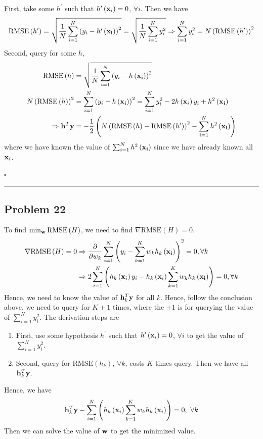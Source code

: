 \documentclass[12pt]{article}
\newcommand*{\QEDB}{\hfill\ensuremath{\square}}
\newcommand{\ParTh}[1]{\left(#1\right)}
\newcommand{\BF}[1]{{\bf#1}}
\newcommand{\horrule}[1]{\rule{\linewidth}{#1}}
\begin{document}
First, take some $h^\prime$ such that $h^\prime\ParTh{\BF{x}_i}=0$, $\forall i$. Then we have
\begin{align}
\text{RMSE}\ParTh{h^\prime}=\sqrt{\dfrac{1}{N}\sum_{i=1}^{N}\ParTh{y_i-h^\prime\ParTh{\BF{x_i}}}^2}=\sqrt{\dfrac{1}{N}\sum_{i=1}^{N}y^2_i}\Rightarrow\sum_{i=1}^{N}y^2_i=N\ParTh{\text{RMSE}\ParTh{h^\prime}}^2
\end{align}
Second, query for some $h$,
\begin{align}
\text{RMSE}\ParTh{h}&=\sqrt{\dfrac{1}{N}\sum_{i=1}^{N}\ParTh{y_i-h\ParTh{\BF{x_i}}}^2}\\
N\ParTh{\text{RMSE}\ParTh{h}}^2&=\sum_{i=1}^{N}\ParTh{y_i-h\ParTh{\BF{x_i}}}^2=\sum_{i=1}^{N}y^2_i-2h\ParTh{\BF{x}_i}y_i+h^2\ParTh{\BF{x_i}}\\
\Rightarrow\BF{h}^T\BF{y}&=-\dfrac{1}{2}\ParTh{N\ParTh{\text{RMSE}\ParTh{h}-\text{RMSE}\ParTh{h^\prime}}^2-\sum_{i=1}^{N}h^2\ParTh{\BF{x_i}}}
\end{align}
where we have known the value of $\sum_{i=1}^{N}h^2\ParTh{\BF{x_i}}$ since we have already known all $\BF{x}_i$.

\QEDB

\horrule{0.5pt}

\subsection*{Problem 22}

To find $\min_{\BF{w}}\text{RMSE}\ParTh{H}$, we need to find $\nabla\text{RMSE}\ParTh{H}=0$.
\begin{align}
\nabla\text{RMSE}\ParTh{H}=0&\Rightarrow\dfrac{\partial}{\partial w_k}\sum_{i=1}^{N}\ParTh{y_i-\sum_{k=1}^{K}w_kh_k\ParTh{\BF{x_i}}}^2=0, \forall k\\
&\Rightarrow2\sum_{i=1}^{N}\ParTh{h_k\ParTh{\BF{x}_i}y_i-h_k\ParTh{\BF{x}_i}\sum_{k=1}^{K}w_kh_k\ParTh{\BF{x_i}}}=0, \forall k
\end{align}
Hence, we need to know the value of $\BF{h}^T_k\BF{y}$ for all $k$. Hence, follow the conclusion above, we need to query for $K+1$ times, where the $+1$ is for querying the value of $\sum_{i=1}^{N}y^2_i$. The derivation steps are
\begin{enumerate}
	\item First, use some hypothesis $h^\prime$ such that $h^\prime\ParTh{\BF{x}_i}=0$, $\forall i$ to get the value of $\sum_{i=1}^{N}y^2_i$.
	\item Second, query for $\text{RMSE}\ParTh{h_k}$, $\forall k$, costs $K$ times query. Then we have all $\BF{h}^T_k\BF{y}$.
\end{enumerate}
Hence, we have
\begin{align}
\BF{h}^T_k\BF{y}-\sum_{i=1}^{N}\ParTh{h_k\ParTh{\BF{x}_i}\sum_{k=1}^{K}w_kh_k\ParTh{\BF{x}_i}}=0,~\forall k
\end{align}
Then we can solve the value of $\BF{w}$ to get the minimized value.

\end{document}
